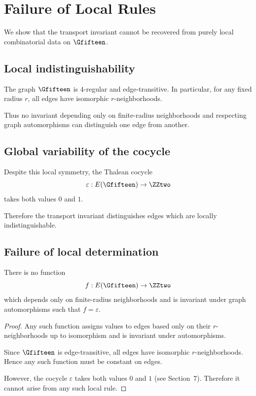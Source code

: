 \section{Failure of Local Rules}

We show that the transport invariant cannot be recovered from purely
local combinatorial data on $\Gfifteen$.

\subsection{Local indistinguishability}

The graph $\Gfifteen$ is $4$-regular and edge-transitive. In particular,
for any fixed radius $r$, all edges have isomorphic $r$-neighborhoods.

Thus no invariant depending only on finite-radius neighborhoods and
respecting graph automorphisms can distinguish one edge from another.

\subsection{Global variability of the cocycle}

Despite this local symmetry, the Thalean cocycle
\[
\varepsilon : E(\Gfifteen) \to \ZZtwo
\]
takes both values $0$ and $1$.

Therefore the transport invariant distinguishes edges which are locally
indistinguishable.

\subsection{Failure of local determination}

\begin{theorem}
There is no function
\[
f : E(\Gfifteen) \to \ZZtwo
\]
which depends only on finite-radius neighborhoods and is invariant under
graph automorphisms such that $f = \varepsilon$.
\end{theorem}

\begin{proof}
Any such function assigns values to edges based only on their
$r$-neighborhoods up to isomorphism and is invariant under automorphisms.

Since $\Gfifteen$ is edge-transitive, all edges have isomorphic
$r$-neighborhoods. Hence any such function must be constant on edges.

However, the cocycle $\varepsilon$ takes both values $0$ and $1$
(see Section~7). Therefore it cannot arise from any such local rule.
\end{proof}

